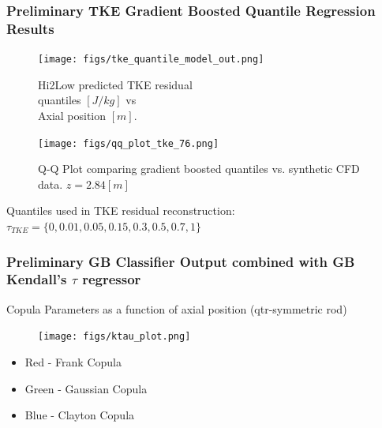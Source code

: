 \documentclass[t, pdftex]{beamer}
\begin{document}
\begin{frame}\frametitle{\small Preliminary TKE Gradient Boosted Quantile Regression Results}
    \begin{figure}
        \centering
        \begin{minipage}{.5\textwidth}
            \centering
            \texttt{[image: figs/tke\_quantile\_model\_out.png]}
            \caption{Hi2Low predicted TKE residual \\ quantiles $[J/kg]$ vs \\ Axial position $[m]$.}
        \end{minipage}%
        \begin{minipage}{.5\textwidth}
            \centering
            \texttt{[image: figs/qq\_plot\_tke\_76.png]}
            \caption{Q-Q Plot comparing gradient boosted quantiles vs. synthetic CFD data. $z=2.84[m]$}
        \end{minipage}
    \end{figure}
Quantiles used in TKE residual reconstruction: $\tau_{TKE}=\{0, 0.01, 0.05, 0.15, 0.3, 0.5, 0.7, 1\}$
\end{frame}


\begin{frame}\frametitle{\small Preliminary GB Classifier Output combined with GB Kendall's $\tau$ regressor}
\tiny Copula Parameters as a function of axial position (qtr-symmetric rod)
\begin{figure}[!htbp]
\centering
\texttt{[image: figs/ktau\_plot.png]}
\label{model_overview}
\end{figure}
\begin{itemize}
\item {\color{red} Red - Frank Copula}
\item {\color{green} Green - Gaussian Copula}
\item {\color{blue} Blue - Clayton Copula}
\end{itemize}
\end{frame}
\end{document}
